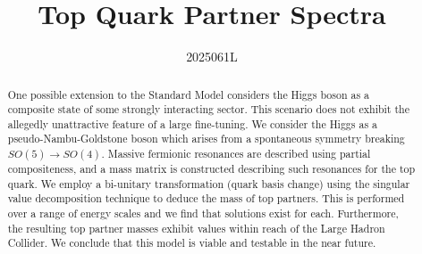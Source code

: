 \documentclass[a4paper]{jpconf}
\begin{document}
\title{Top Quark Partner Spectra}
\author{2025061L}
\address{School of Physics \& Astronomy, University of Glasgow, UK}
\begin{abstract}
One possible extension to the Standard Model considers the Higgs boson as a composite state of some strongly interacting sector. This scenario does not exhibit the allegedly unattractive feature of a large fine-tuning. We consider the Higgs as a pseudo-Nambu-Goldstone boson which arises from a spontaneous symmetry breaking \(SO(5) \to SO(4)\). Massive fermionic resonances are described using partial compositeness, and a mass matrix is constructed describing such resonances for the top quark. We employ a bi-unitary transformation (quark basis change) using the singular value decomposition technique to deduce the mass of top partners. This is performed over a range of energy scales and we find that solutions exist for each. Furthermore, the resulting top partner masses exhibit values within reach of the Large Hadron Collider. We conclude that this model is viable and testable in the near future.      
\end{abstract}
\end{document}
